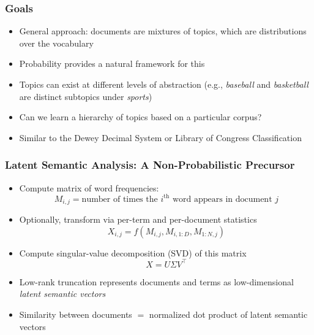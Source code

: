 \documentclass{beamer}
\newcommand{\nth}{^{\text{th}}}
\begin{document}
\begin{frame}
\frametitle{Goals}
\begin{itemize}[<+->]
\item General approach: documents are mixtures of topics, which are distributions over the vocabulary
\item Probability provides a natural framework for this
\item Topics can exist at different levels of abstraction (e.g., \emph{baseball} and \emph{basketball} are distinct subtopics under \emph{sports})
\item Can we learn a hierarchy of topics based on a particular corpus?
\item Similar to the Dewey Decimal System or Library of Congress Classification
\end{itemize}
\end{frame}

\begin{frame}
\frametitle{Latent Semantic Analysis: A Non-Probabilistic Precursor}
\begin{itemize}[<+->]
\item Compute matrix of word frequencies:
\[ M_{i,j} = \text{number of times the $i\nth$ word appears in document $j$} \]
\item Optionally, transform via per-term and per-document statistics
\[ X_{i,j} = f(M_{i,j}, M_{i,1:D}, M_{1:N,j}) \]
\item Compute singular-value decomposition (SVD) of this matrix
\[ X = U \Sigma V^\top \]
\item Low-rank truncation represents documents and terms as low-dimensional \emph{latent semantic vectors}
\item Similarity between documents $=$ normalized dot product of latent semantic vectors
\end{itemize}
\end{frame}
\end{document}
